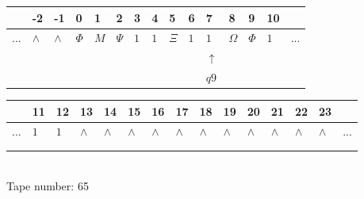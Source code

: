 \documentclass[11pt]{article}
\begin{document}
\begin{table}[H]
\centering
\begin{tabular}{lllllllllllllll}
 & -2 & -1 & 0 & 1 & 2 & 3 & 4 & 5 & 6 & 7 & 8 & 9 & 10 & \\
\hline
$...$ & \multicolumn{1}{|l|}{$\wedge$} & \multicolumn{1}{|l|}{$\wedge$} & \multicolumn{1}{|l|}{$\Phi$} & \multicolumn{1}{|l|}{$M$} & \multicolumn{1}{|l|}{$\Psi$} & \multicolumn{1}{|l|}{$1$} & \multicolumn{1}{|l|}{$1$} & \multicolumn{1}{|l|}{$\Xi$} & \multicolumn{1}{|l|}{$1$} & \multicolumn{1}{|l|}{$1$} & \multicolumn{1}{|l|}{$\Omega$} & \multicolumn{1}{|l|}{$\Phi$} & \multicolumn{1}{|l|}{$1$} & $...$\\
\hline
&  &  &  &  &  &  &  &  &  & $\uparrow$ &  &  &  &  \\
&  &  &  &  &  &  &  &  &  & $ q9 $ &  &  &  &  \\
\end{tabular}
\begin{tabular}{lllllllllllllll}
 & 11 & 12 & 13 & 14 & 15 & 16 & 17 & 18 & 19 & 20 & 21 & 22 & 23 & \\
\hline
$...$ & \multicolumn{1}{|l|}{$1$} & \multicolumn{1}{|l|}{$1$} & \multicolumn{1}{|l|}{$\wedge$} & \multicolumn{1}{|l|}{$\wedge$} & \multicolumn{1}{|l|}{$\wedge$} & \multicolumn{1}{|l|}{$\wedge$} & \multicolumn{1}{|l|}{$\wedge$} & \multicolumn{1}{|l|}{$\wedge$} & \multicolumn{1}{|l|}{$\wedge$} & \multicolumn{1}{|l|}{$\wedge$} & \multicolumn{1}{|l|}{$\wedge$} & \multicolumn{1}{|l|}{$\wedge$} & \multicolumn{1}{|l|}{$\wedge$} & $...$\\
\hline
&  &  &  &  &  &  &  &  &  &  &  &  &  &  \\
&  &  &  &  &  &  &  &  &  &  &  &  &  &  \\
\end{tabular}
\\
Tape number: 65
\noindent\makebox[\linewidth]{\hdashrule{\textwidth}{1pt}{1pt}}\end{table}
\end{document}
